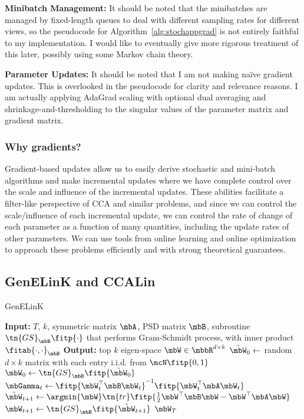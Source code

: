 \documentclass{article}
\begin{document}
	\noindent \textbf{Minibatch Management:} It should be noted that the minibatches are managed by fixed-length queues to deal with different sampling rates for different views, so the pseudocode for Algorithm~\ref{alg:stochappgrad} is not entirely faithful to my implementation. I would like to eventually give more rigorous treatment of this later, possibly using some Markov chain theory.
	
	\noindent \textbf{Parameter Updates:} It should be noted that I am not making na\"{i}ve gradient updates. This is overlooked in the pseudocode for clarity and relevance reasons. I am actually applying AdaGrad scaling with optional dual averaging and shrinkage-and-thresholding to the singular values of the parameter matrix and gradient matrix.
	
	\subsubsection{Why gradients?} \label{subsubsec:whygradients}
	Gradient-based updates allow us to easily derive stochastic and mini-batch algorithms and make incremental updates where we have complete control over the scale and influence of the incremental updates. These abilities facilitate a filter-like perspective of CCA and similar problems, and since we can control the scale/influence of each incremental update, we can control the rate of change of each parameter as a function of many quantities, including the update rates of other parameters. We can use tools from online learning and online optimization to approach these problems efficiently and with strong theoretical guarantees.
	
	\subsection{GenELinK and CCALin} \label{subsec:genelinkandccalin}
	
	\begin{algorithm}
	\caption{GenELinK} \label{alg:genelink}
	\begin{algorithmic}[1]
	\STATE \textbf{Input:} $T$, $k$, symmetric matrix $\mbA$, PSD matrix $\mbB$, subroutine $\tn{GS}_{\mbB}\fitp{\cdot}$ that performs Gram-Schmidt process, with inner product $\fitab{\cdot,\cdot}_{\mbB}$
	\STATE \textbf{Output:} top $k$ eigen-space $\mbW \in \mbbR^{d \times k}$
	\STATE $\tilde{\mbW}_0 \leftarrow$ random $d \times k$ matrix with each entry i.i.d. from $\mcN \fitp{0,1}$
	\STATE $\mbW_0 \leftarrow \tn{GS}_{\mbB}\fitp{\tilde{\mbW}_0}$
	\STATE $\mbGamma_t \leftarrow \fitp{\mbW_t^{\top}\mbB\mbW_t}^{-1}\fitp{\mbW_t^{\top}\mbA\mbW_t}$
	\STATE $\tilde{\mbW}_{t+1} \leftarrow \argmin{\mbW} \tn{tr}\fitp{\frac{1}{2}\mbW^{\top}\mbB\mbW - \mbW^{\top}\mbA\mbW}$
	\STATE $\mbW_{t+1} \leftarrow \tn{GS}_{\mbB}\fitp{\tilde{\mbW}_{t+1}}$
	\ENDFOR
	\RETURN $\mbW_T$
	\end{algorithmic}
	\end{algorithm}
	
\end{document}
